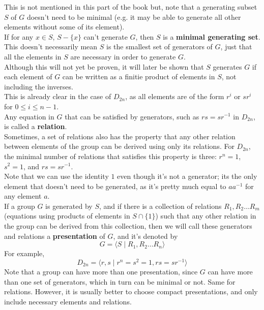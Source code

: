 \documentclass[12pt]{article}
\begin{document}
    This is not mentioned in this part of the book but,
    note that a generating subset $S$ of $G$ doesn't need to be minimal
    (e.g. it may be able to generate all other elements without some of
    its element). \\
    If for any $x \in S$, $S - \{x\}$ can't generate $G$,
    then $S$ is a \textbf{minimal generating set}.
    This doesn't necessarily mean $S$ is the smallest set of generators
    of $G$,
    just that all the elements in $S$ are necessary
    in order to generate $G$. \\
    
    Although this will not yet be proven,
    it will later be shown that $S$ generates $G$
    if each element of $G$
    can be written as a finitie product of elements in $S$,
    not including the inverses. \\
    This is already clear in the case of $D_{2n}$,
    as all elements are of the form $r^i$ or $sr^{i}$
    for $0 \leqslant i \leqslant n-1$. \\

    Any equation in $G$ that can be satisfied by generators,
    such as $rs = sr^{-1}$ in $D_{2n}$,
    is called a \textbf{relation}. \\
    Sometimes, a set of relations also has the property that 
    any other relation between elements of the group can be derived
    using only its relations.
    For $D_{2n}$, the minimal number of relations that satisfies
    this property is three:
    $r^n = 1$, $s^2 = 1$, and $rs = sr^{-1}$. \\
    Note that we can use the identity $1$ even though it's not a generator;
    its the only element that doesn't need to be generated,
    as it's pretty much equal to $aa^{-1}$ for any element $a$. \\

    If a group $G$ is generated by $S$,
    and if there is a collection of relations $R_1, R_2 \dots R_m$
    (equations using products of elements in $S \cap \{1\}$)
    such that any other relation in the group can be derived
    from this collection, 
    then we will call these generators and relations
    a \textbf{presentation} of $G$,
    and it's denoted by
    \[ G = \langle S \mid R_1, R_2 \dots R_n \rangle \]
    For example,
    \[ D_{2n} = \langle r, s \mid r^n = s^2 = 1, rs = sr^{-1} \rangle \]
    Note that a group can have more than one presentation,
    since $G$ can have more than one set of generators,
    which in turn can be minimal or not.
    Same for relations.
    However, it is usually better to choose compact presentations,
    and only include necessary elements and relations. \\
\end{document}

